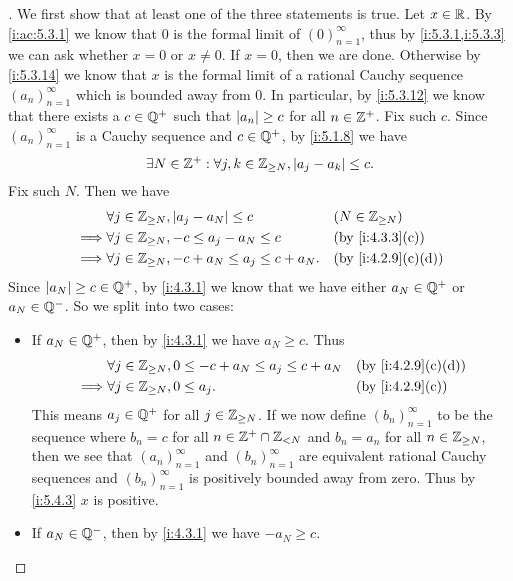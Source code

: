 \begin{proof}[]
  We first show that at least one of the three statements is true.
  Let \(x \in \mathbb{R}\).
  By \cref{i:ac:5.3.1} we know that \(0\) is the formal limit of \((0)_{n = 1}^\infty\), thus by \cref{i:5.3.1,i:5.3.3} we can ask whether \(x = 0\) or \(x \neq 0\).
  If \(x = 0\), then we are done.
  Otherwise by \cref{i:5.3.14} we know that \(x\) is the formal limit of a rational Cauchy sequence \((a_n)_{n = 1}^\infty\) which is bounded away from \(0\).
  In particular, by \cref{i:5.3.12} we know that there exists a \(c \in \mathbb{Q}^+\) such that \(\left\lvert a_n\right\rvert \geq c\) for all \(n \in \mathbb{Z}^+\).
  Fix such \(c\).
  Since \((a_n)_{n = 1}^{\infty}\) is a Cauchy sequence and \(c \in \mathbb{Q}^+\), by \cref{i:5.1.8} we have
  \[
    \exists N \in \mathbb{Z}^+ : \forall j, k \in \mathbb{Z}_{\geq N}, \left\lvert a_j - a_k\right\rvert \leq c.
  \]
  Fix such \(N\).
  Then we have
  \begin{align*}
             & \forall j \in \Z_{\geq N}, \abs{a_j - a_N} \leq c          &  & (N \in \Z_{\geq N}) \\
    \implies & \forall j \in \Z_{\geq N}, -c \leq a_j - a_N \leq c        &  & \by{i:4.3.3}[c]     \\
    \implies & \forall j \in \Z_{\geq N}, -c + a_N \leq a_j \leq c + a_N. &  & \by{i:4.2.9}[c,d]
  \end{align*}
  Since \(\left\lvert a_N\right\rvert \geq c \in \mathbb{Q}^+\), by \cref{i:4.3.1} we know that we have either \(a_N \in \mathbb{Q}^+\) or \(a_N \in \mathbb{Q}^-\).
  So we split into two cases:
  \begin{itemize}
    \item If \(a_N \in \mathbb{Q}^+\), then by \cref{i:4.3.1} we have \(a_N \geq c\).
          Thus
          \begin{align*}
                     & \forall j \in \Z_{\geq N}, 0 \leq -c + a_N \leq a_j \leq c + a_N &  & \by{i:4.2.9}[c,d] \\
            \implies & \forall j \in \Z_{\geq N}, 0 \leq a_j.                           &  & \by{i:4.2.9}[c]
          \end{align*}
          This means \(a_j \in \mathbb{Q}^+\) for all \(j \in \mathbb{Z}_{\geq N}\).
          If we now define \((b_n)_{n = 1}^\infty\) to be the sequence where \(b_n = c\) for all \(n \in \mathbb{Z}^+ \cap \mathbb{Z}_{< N}\) and \(b_n = a_n\) for all \(n \in \mathbb{Z}_{\geq N}\), then we see that \((a_n)_{n = 1}^\infty\) and \((b_n)_{n = 1}^\infty\) are equivalent rational Cauchy sequences and \((b_n)_{n = 1}^\infty\) is positively bounded away from zero.
          Thus by \cref{i:5.4.3} \(x\) is positive.
    \item If \(a_N \in \mathbb{Q}^-\), then by \cref{i:4.3.1} we have \(-a_N \geq c\).

\end{itemize}
\end{proof}
